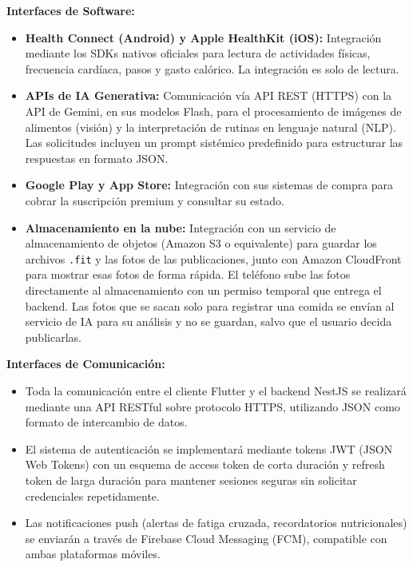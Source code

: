 \textbf{Interfaces de Software:}
\begin{itemize}
    \item \textbf{Health Connect (Android) y Apple HealthKit (iOS):} Integración mediante los SDKs nativos oficiales para lectura de actividades físicas, frecuencia cardíaca, pasos y gasto calórico. La integración es solo de lectura.
    \item \textbf{APIs de IA Generativa:} Comunicación vía API REST (HTTPS) con la API de Gemini, en sus modelos Flash, para el procesamiento de imágenes de alimentos (visión) y la interpretación de rutinas en lenguaje natural (NLP). Las solicitudes incluyen un prompt sistémico predefinido para estructurar las respuestas en formato JSON.
    \item \textbf{Google Play y App Store:} Integración con sus sistemas de compra para cobrar la suscripción premium y consultar su estado.
    \item \textbf{Almacenamiento en la nube:} Integración con un servicio de almacenamiento de objetos (Amazon S3 o equivalente) para guardar los archivos \texttt{.fit} y las fotos de las publicaciones, junto con Amazon CloudFront para mostrar esas fotos de forma rápida. El teléfono sube las fotos directamente al almacenamiento con un permiso temporal que entrega el backend. Las fotos que se sacan solo para registrar una comida se envían al servicio de IA para su análisis y no se guardan, salvo que el usuario decida publicarlas.
\end{itemize}

\textbf{Interfaces de Comunicación:}
\begin{itemize}
    \item Toda la comunicación entre el cliente Flutter y el backend NestJS se realizará mediante una API RESTful sobre protocolo HTTPS, utilizando JSON como formato de intercambio de datos.
    \item El sistema de autenticación se implementará mediante tokens JWT (JSON Web Tokens) con un esquema de access token de corta duración y refresh token de larga duración para mantener sesiones seguras sin solicitar credenciales repetidamente.
    \item Las notificaciones push (alertas de fatiga cruzada, recordatorios nutricionales) se enviarán a través de Firebase Cloud Messaging (FCM), compatible con ambas plataformas móviles.
\end{itemize}

